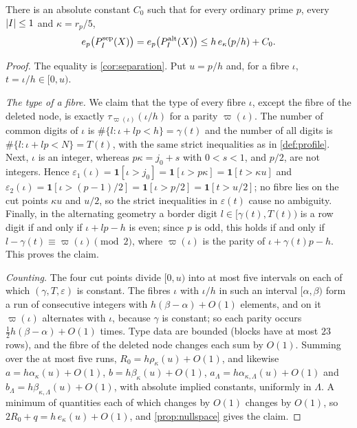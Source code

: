 \begin{lemma}\label{lem:profile-bound}
There is an absolute constant $C_0$ such that for every ordinary prime $p$, every $\lvert I\rvert\le1$
and $\kappa=r_p/5$,
\[
  e_p\bigl(P^{\mathrm{sep}}_I(X)\bigr)=e_p\bigl(P^{\mathrm{alt}}_I(X)\bigr)\le h\,e_\kappa(p/h)+C_0 .
\]
\end{lemma}

\begin{proof}
The equality is \cref{cor:separation}. Put $u=p/h$ and, for a fibre $\iota$, $t=\iota/h\in[0,u)$.

\emph{The type of a fibre.} We claim that the type of every fibre $\iota$, except the fibre of
the deleted node, is exactly $\tau_{\varpi(\iota)}(\iota/h)$ for a parity $\varpi(\iota)$. The
number of common digits of $\iota$ is $\#\{l:\iota+lp<h\}=\gamma(t)$ and the number of all digits is
$\#\{l:\iota+lp<N\}=T(t)$, with the same strict inequalities as in \cref{def:profile}. Next,
$\iota$ is an integer, whereas $p\kappa=j_0+s$ with $0<s<1$, and $p/2$, are not integers. Hence
$\varepsilon_1(\iota)=\mathbf1[\iota>j_0]=\mathbf1[\iota>p\kappa]=\mathbf1[t>\kappa u]$ and
$\varepsilon_2(\iota)=\mathbf1[\iota>(p-1)/2]=\mathbf1[\iota>p/2]=\mathbf1[t>u/2]$; no fibre lies on
the cut points $\kappa u$ and $u/2$, so the strict inequalities in $\varepsilon(t)$ cause no
ambiguity. Finally, in the alternating geometry a border digit $l\in[\gamma(t),T(t))$ is a row
digit if and only if $\iota+lp-h$ is even; since $p$ is odd, this holds if and only if
$l-\gamma(t)\equiv\varpi(\iota)\pmod2$, where $\varpi(\iota)$ is the parity of $\iota+\gamma(t)p-h$.
This proves the claim.

\emph{Counting.} The four cut points divide $[0,u)$ into at most five intervals on each of which
$(\gamma,T,\varepsilon)$ is constant. The fibres $\iota$ with $\iota/h$ in such an interval
$[\alpha,\beta)$ form a run of consecutive integers with $h(\beta-\alpha)+O(1)$ elements, and on
it $\varpi(\iota)$ alternates with $\iota$, because $\gamma$ is constant; so each parity occurs
$\frac12h(\beta-\alpha)+O(1)$ times. Type data are bounded (blocks have at most $23$ rows), and the
fibre of the deleted node changes each sum by $O(1)$. Summing over the at most five runs,
$R_0=h\rho_\kappa(u)+O(1)$, and likewise $a=h\alpha_\kappa(u)+O(1)$, $b=h\beta_\kappa(u)+O(1)$,
$a_\Lambda=h\alpha_{\kappa,\Lambda}(u)+O(1)$ and $b_\Lambda=h\beta_{\kappa,\Lambda}(u)+O(1)$, with
absolute implied constants, uniformly in $\Lambda$. A minimum of quantities each of which changes
by $O(1)$ changes by $O(1)$, so $2R_0+q=h\,e_\kappa(u)+O(1)$, and \cref{prop:nullspace} gives the
claim.
\end{proof}

